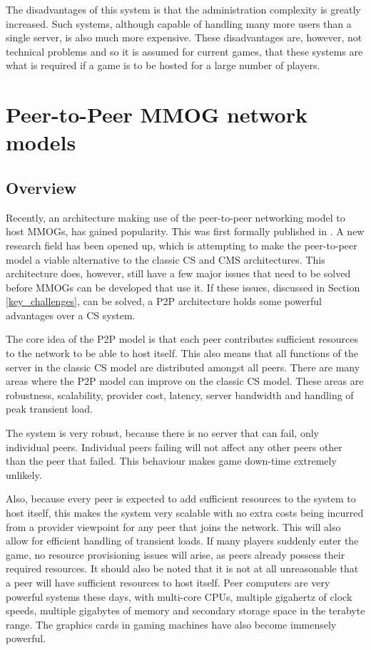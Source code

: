\documentclass[journal,oneside,a4paper,onecolumn]{IEEEtran}
\begin{document}
The disadvantages of this system is that the administration complexity is greatly increased. Such systems, although capable of handling many more users than a single server, is also much more expensive. These disadvantages are, however, not technical problems and so it is assumed for current games, that these systems are what is required if a game is to be hosted for a large number of players.

\section{Peer-to-Peer MMOG network models}
\label{p2p_network_models}

\subsection{Overview}
\label{p2p_mmog_overview}

Recently, an architecture making use of the peer-to-peer networking model to host MMOGs, has gained popularity. This was first formally published in \cite{knutsson_p2p_first}. A new research field has been opened up, which is attempting to make the peer-to-peer model a viable alternative to the classic \ac{CS} and \ac{CMS} architectures. This architecture does, however, still have a few major issues that need to be solved before MMOGs can be developed that use it. If these issues, discussed in Section \ref{key_challenges}, can be solved, a \ac{P2P} architecture holds some powerful advantages over a \ac{CS} system.

The core idea of the \ac{P2P} model is that each peer contributes sufficient resources to the network to be able to host itself. This also means that all functions of the server in the classic \ac{CS} model are distributed amongst all peers. There are many areas where the \ac{P2P} model can improve on the classic \ac{CS} model. These areas are robustness, scalability, provider cost, latency, server bandwidth and handling of peak transient load.

The system is very robust, because there is no server that can fail, only individual peers. Individual peers failing will not affect any other peers other than the peer that failed. This behaviour makes game down-time extremely unlikely.

Also, because every peer is expected to add sufficient resources to the system to host itself, this makes the system very scalable with no extra costs being incurred from a provider viewpoint for any peer that joins the network. This will also allow for efficient handling of transient loads. If many players suddenly enter the game, no resource provisioning issues will arise, as peers already possess their required resources. It should also be noted that it is not at all unreasonable that a peer will have sufficient resources to host itself. Peer computers are very powerful systems these days, with multi-core CPUs, multiple gigahertz of clock speeds, multiple gigabytes of memory and secondary storage space in the terabyte range. The graphics cards in gaming machines have also become immensely powerful.
\end{document}
